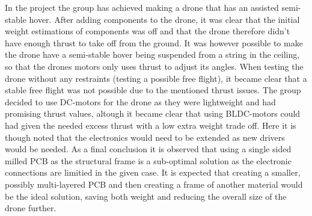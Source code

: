 In the project the group has achieved making a drone that has an assisted semi-stable hover. After adding components to the drone, it was clear that the initial weight estimations of components was off and that the drone therefore didn't have enough thrust to take off from the ground. 
It was however possible to make the drone have a semi-stable hover being suspended from a string in the ceiling, so that the drones motors only uses thrust to adjust its angles. When testing the drone without any restraints (testing a possible free flight), it became clear that a stable free flight was not possible due to the mentioned thrust issues. The group decided to use DC-motors for the drone as they were lightweight and had promising thrust values, altough it became clear that using BLDC-motors could had given the needed excess thrust with a low extra weight trade off. Here it is though noted that the electronics would need to be extended as new drivers would be needed. As a final conclusion it is observed that using a single sided milled PCB as the structural frame is a sub-optimal solution as the electronic connections are limitied in the given case. It is expected that creating a smaller, possibly multi-layered PCB and then creating a frame of another material would be the ideal solution, saving both weight and reducing the overall size of the drone further.
